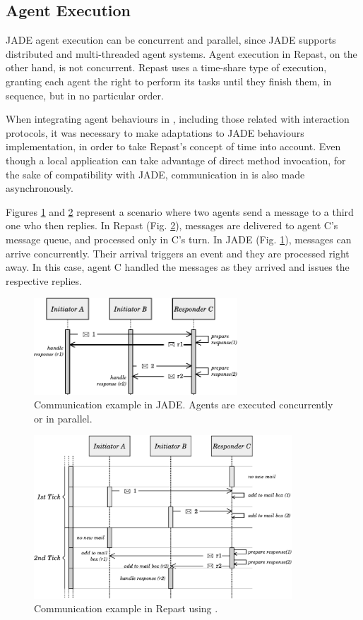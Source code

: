 \subsection{Agent Execution}

JADE agent execution can be concurrent and parallel, since JADE supports distributed and multi-threaded agent systems. Agent execution in Repast, on the other hand, is not concurrent. Repast uses a time-share type of execution, granting each agent the right to perform its tasks until they finish them, in sequence, but in no particular order.

When integrating agent behaviours in \apiname{}, including those related with interaction protocols, it was necessary to make adaptations to JADE behaviours implementation, in order to take Repast's concept of time into account. Even though a local application can take advantage of direct method invocation, for the sake of compatibility with JADE, communication in \apiname{} is also made asynchronously.

Figures \ref{fig:com-example-jade} and \ref{fig:com-example-repast} represent a scenario where two agents send a message to a third one who then replies. In Repast (Fig. \ref{fig:com-example-repast}), messages are delivered to agent C's message queue, and processed only in C's turn. In JADE (Fig. \ref{fig:com-example-jade}), messages can arrive concurrently. Their arrival triggers an event and they are processed right away. In this case, agent C handled the messages as they arrived and issues the respective replies.

\begin{figure}
	\centering
	\includegraphics[width=3.0in]{figures/tickExample2.pdf}
	\caption{
		Communication example in JADE. Agents are executed concurrently or in parallel. 
	}
	\label{fig:com-example-jade}
\end{figure}

\begin{figure}
	\centering
	\includegraphics[width=3.8in]{figures/tickExample.pdf}
	\caption{
		Communication example in Repast using \apiname{}.
	}
	\label{fig:com-example-repast}
\end{figure}

